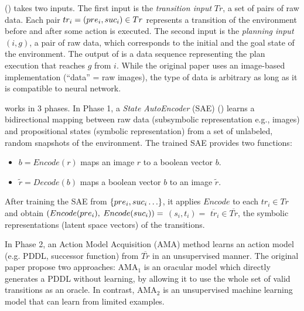 \latentplanner () takes two inputs.
The first input is the \emph{transition input} $Tr$, a set of pairs of raw data.
Each pair $tr_i=(pre_i, suc_i) \in Tr$ represents a transition of the environment before and after some action is executed.
The second input is the \emph{planning input} $(i, g)$, a pair of raw data, which corresponds to the initial and the goal state of the environment.
The output of \latentplanner is a data sequence representing the plan execution that reaches $g$ from $i$.
While the original paper uses an image-based implementation (``data'' = raw images),
the type of data is arbitrary as long as it is compatible to neural network.


\latentplanner works in 3 phases.
In Phase 1, a \emph{State AutoEncoder} (SAE) () learns a bidirectional mapping between raw data (subsymbolic representation e.g., images)
 and propositional states (symbolic representation) from a set of unlabeled, random snapshots of the environment.
The trained SAE provides two functions:
\begin{itemize} %
\setlength{\itemsep}{-0.3em}
\item $b=Encode(r)$ maps an image  $r$ to a boolean vector $b$.
\item $\tilde{r}=Decode(b)$ maps a boolean vector $b$ to an image $\tilde{r}$.
\end{itemize}
After training the SAE from ${\left\{pre_i, suc_i\ldots\right\}}$,
it applies $Encode$ to each $tr_i \in Tr$ and obtain $(Encode(pre_i),$ $Encode(suc_i))=$ $(s_i,t_i)=$ $\overline{tr}_i\in \overline{Tr}$,
the symbolic representations (latent space vectors) of the transitions.

In Phase 2, an Action Model Acquisition (AMA) method learns an action model (e.g. PDDL, successor function) from $\overline{Tr}$ in an unsupervised manner.
The original paper propose two approaches: AMA$_1$ is an oracular model which directly generates a PDDL without learning,
by allowing it to use the whole set of valid transitions as an oracle.
In contrast, AMA$_2$ is an unsupervised machine learning model that can learn from limited examples.

